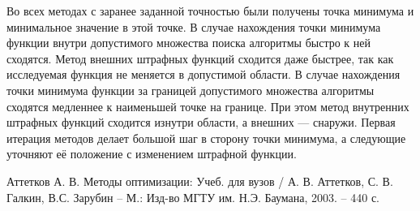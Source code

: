 \documentclass[12pt, a4paper]{article}
\begin{document}
Во всех методах с заранее заданной точностью были получены точка минимума и минимальное значение в этой точке. 
В случае нахождения точки минимума функции внутри допустимого множества поиска алгоритмы быстро к ней сходятся. Метод внешних штрафных функций сходится даже быстрее, так как исследуемая функция не меняется в допустимой области. В случае нахождения точки минимума функции за границей допустимого множества алгоритмы сходятся медленнее к наименьшей точке на границе. При этом метод внутренних штрафных функций сходится изнутри области, а внешних — снаружи. Первая итерация методов делает большой шаг в сторону точки минимума, а следующие уточняют её положение с изменением штрафной функции. 

\newpage
\begin{thebibliography}{3}
	 Аттетков А. В. Методы оптимизации: Учеб. для вузов / А. В. Аттетков, С. В. Галкин, В.С. Зарубин –  М.: Изд-во МГТУ им. Н.Э. Баумана, 2003. – 440 с.
	
	
\end{thebibliography}
\end{document}
